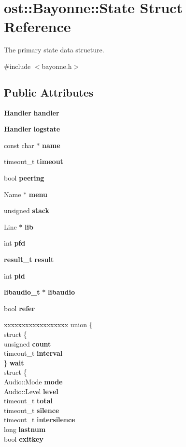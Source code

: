\section{ost::Bayonne::State Struct Reference}
\label{structost_1_1_bayonne_1_1_state}


The primary state data structure.  


{\ttfamily \#include $<$bayonne.h$>$}\subsection*{Public Attributes}
\begin{DoxyCompactItemize}
\item 
{\bf Handler} {\bf handler}
\item 
{\bf Handler} {\bf logstate}
\item 
const char $\ast$ {\bf name}
\item 
timeout\_\-t {\bf timeout}
\item 
bool {\bf peering}
\item 
Name $\ast$ {\bf menu}
\item 
unsigned {\bf stack}
\item 
Line $\ast$ {\bf lib}
\item 
int {\bf pfd}
\item 
{\bf result\_\-t} {\bf result}
\item 
int {\bf pid}
\item 
{\bf libaudio\_\-t} $\ast$ {\bf libaudio}
\item 
bool {\bf refer}
\item 
\begin{tabbing}
xx\=xx\=xx\=xx\=xx\=xx\=xx\=xx\=xx\=\kill
union \{\\
\>struct \{\\
\>\>unsigned {\bf count}\\
\>\>timeout\_t {\bf interval}\\
\>\} {\bf wait}\\
\>struct \{\\
\>\>Audio::Mode {\bf mode}\\
\>\>Audio::Level {\bf level}\\
\>\>timeout\_t {\bf total}\\
\>\>timeout\_t {\bf silence}\\
\>\>timeout\_t {\bf intersilence}\\
\>\>long {\bf lastnum}\\
\>\>bool {\bf exitkey}\\

\end{tabbing}
\end{DoxyCompactItemize}
